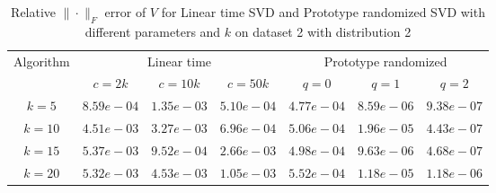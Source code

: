 \begin{table}\label{V22}
\centering
\begin{tabular}{|c|c|c|c|c|c|c|}

\hline
\multirow{2}{*}{ Algorithm} &\multicolumn{3}{c|}{Linear time} &\multicolumn{3}{c|}{Prototype randomized}\\\cline{2-7}
 &$c=2k$ &$c=10k$ &$c=50k$ &$q=0$ &$q=1$ &$q=2$\\\hline
$k=5$ & $8.59e-04$ & $1.35e-03$ & $5.10e-04$ & $4.77e-04$ & $8.59e-06$ & $9.38e-07$\\\hline
$k=10$ & $4.51e-03$ & $3.27e-03$ & $6.96e-04$ & $5.06e-04$ & $1.96e-05$ & $4.43e-07$\\\hline
$k=15$ & $5.37e-03$ & $9.52e-04$ & $2.66e-03$ & $4.98e-04$ & $9.63e-06$ & $4.68e-07$\\\hline
$k=20$ & $5.32e-03$ & $4.53e-03$ & $1.05e-03$ & $5.52e-04$ & $1.18e-05$ & $1.18e-06$\\\hline
\end{tabular}
\caption{Relative $\|\cdot\|_F$ error of $V$ for Linear time SVD and Prototype randomized SVD with different parameters and $k$ on dataset 2 with distribution 2}
\end{table}
